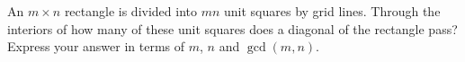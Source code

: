 An $m\times n$ rectangle is divided into $mn$ unit squares by grid lines. Through the interiors of how many of these unit squares does a diagonal of the rectangle pass? Express your answer in terms of $m$, $n$ and $\gcd(m,n)$.
